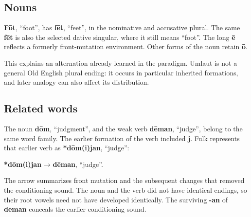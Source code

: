 \subsection*{Nouns}
\textbf{Fōt}, “foot”, has \textbf{fēt}, “feet”, in the nominative and accusative plural. The same \textbf{fēt} is also the selected dative singular, where it still means “foot”. The long \textbf{ē} reflects a formerly front-mutation environment. Other forms of the noun retain \textbf{ō}.\par
This explains an alternation already learned in the paradigm. Umlaut is not a general Old English plural ending: it occurs in particular inherited formations, and later analogy can also affect its distribution.\par
\subsection*{Related words}
The noun \textbf{dōm}, “judgment”, and the weak verb \textbf{dēman}, “judge”, belong to the same word family. The earlier formation of the verb included \textbf{j}. Fulk represents that earlier verb as \textbf{*dōm(i)jan}, “judge”:\par
\textbf{*dōm(i)jan} → \textbf{dēman}, “judge”.\par
The arrow summarizes front mutation and the subsequent changes that removed the conditioning sound. The noun and the verb did not have identical endings, so their root vowels need not have developed identically. The surviving \textbf{-an} of \textbf{dēman} conceals the earlier conditioning sound.\par
